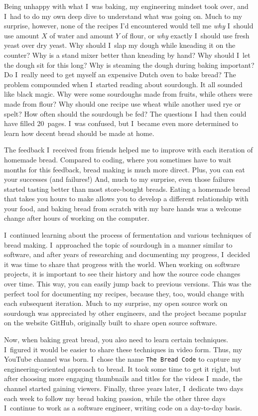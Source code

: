 Being unhappy with what I~was baking, my engineering mindset took over, and
I~had to do my own deep dive to understand what was going on. Much to my
surprise, however, none of the recipes I'd encountered would tell me
\emph{why} I~should use amount $X$ of water and amount $Y$ of flour, or
\emph{why} exactly I~should use fresh yeast over dry yeast. Why should I~slap
my dough while kneading it on the counter? Why is a stand mixer better than
kneading by hand? Why should I~let the dough sit for this long?  Why is
steaming the dough during baking important? Do I~really need to get myself an
expensive Dutch oven to bake bread?  The problem compounded when I~started
reading about sourdough. It all sounded like black magic. Why were some
sourdoughs made from fruits, while others were made from flour?  Why should
one recipe use wheat while another used rye or spelt? How often should the
sourdough be fed? The questions I~had then could have filled 20~pages. I~was
confused, but I~became even more determined to learn how decent bread should
be made at home.

The feedback I~received from friends helped me to improve with each
iteration of homemade bread. Compared to coding, where you sometimes have to wait months
for this feedback, bread making is much more direct. Plus, you can eat your successes
(and failures!) And, much to my surprise, even those failures started tasting better than
most store-bought breads. Eating a homemade bread that takes you hours to make allows you
to develop a different relationship with your food, and baking bread from scratch with my
bare hands was a welcome change after hours of working on the computer.

I~continued learning about the process of fermentation and various techniques of bread making.
I~approached the topic of sourdough in a manner similar to software, and after years of
researching and documenting my progress, I~decided it was time to share that progress with the
world.
When working on software projects, it is important to see their history and how the source
code changes over time. This way, you can easily jump back to previous versions. This was
the perfect tool for documenting my recipes, because they, too, would change with each
subsequent iteration. Much to my surprise, my open source work on sourdough was appreciated
by other engineers, and the project became popular on the website GitHub, originally built to
share open source software.

Now, when baking great bread, you also need to learn certain techniques. I~figured it would be
easier to share these techniques in video form. Thus, my YouTube channel was born. I~chose
the name \texttt{The Bread Code} to capture my engineering-oriented approach to bread. It took some
time to get it right, but after choosing more engaging thumbnails and titles for
the videos I~made, the channel started gaining viewers.
Finally, three years later, I~dedicate two days each week to follow my bread baking passion, while
the other three days I~continue to work as a software engineer, writing code on a day-to-day
basis.

